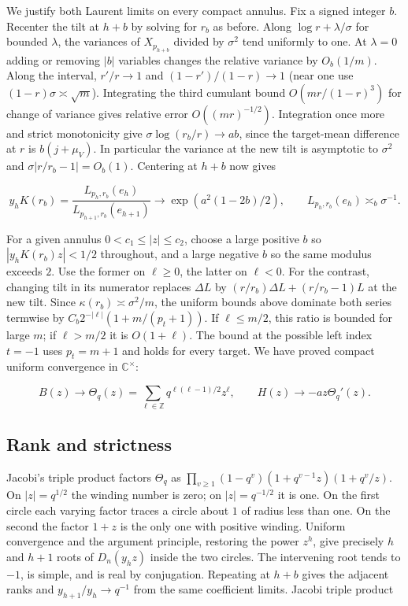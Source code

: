 \documentclass[11pt]{article}
\begin{document}
We justify both Laurent limits on every compact annulus. Fix a signed integer \(b\). Recenter the tilt at \(h+b\) by solving for \(r_b\) as before. Along \(\log r+\lambda/\sigma\) for bounded \(\lambda\), the variances of \(X_{p_{h+b}}\) divided by \(\sigma^2\) tend uniformly to one. At \(\lambda=0\) adding or removing \(|b|\) variables changes the relative variance by \(O_b(1/m)\). Along the interval, \(r'/r\to1\) and \((1-r')/(1-r)\to1\) (near one use \((1-r)\sigma\asymp\sqrt m\)). Integrating the third cumulant bound \(O(mr/(1-r)^3)\) for change of variance gives relative error \(O((mr)^{-1/2})\). Integration once more and strict monotonicity give \(\sigma\log(r_b/r)\to ab\), since the target-mean difference at \(r\) is \(b(j+\mu_V)\). In particular the variance at the new tilt is asymptotic to \(\sigma^2\) and \(\sigma|r/r_b-1|=O_b(1)\). Centering at \(h+b\) now gives

\begin{equation*}
y_h K(r_b)=\frac{L_{p_h,r_b}(e_h)}{L_{p_{h+1},r_b}(e_{h+1})}\longrightarrow \exp(a^2(1-2b)/2),\qquad
L_{p_h,r_b}(e_h)\asymp_b \sigma^{-1}.
\end{equation*}

For a given annulus \(0<c_1\le |z|\le c_2\), choose a large positive \(b\) so \(|y_hK(r_b)z|<1/2\) throughout, and a large negative \(b\) so the same modulus exceeds \(2\). Use the former on \(\ell\ge0\), the latter on \(\ell<0\). For the contrast, changing tilt in its numerator replaces \(\Delta L\) by \((r/r_b)\Delta L+(r/r_b-1)L\) at the new tilt. Since \(\kappa(r_b)\asymp\sigma^2/m\), the uniform bounds above dominate both series termwise by \(C_b2^{-|\ell|}(1+m/(p_t+1))\). If \(\ell\le m/2\), this ratio is bounded for large \(m\); if \(\ell>m/2\) it is \(O(1+\ell)\). The bound at the possible left index \(t=-1\) uses \(p_t=m+1\) and holds for every target. We have proved compact uniform convergence in \(\mathbb C^\times\):

\begin{equation*}
B(z)\longrightarrow \Theta_q(z)=\sum_{\ell\in\mathbb Z}q^{\ell(\ell-1)/2}z^\ell,\qquad
H(z)\longrightarrow -a z\Theta_q'(z).
\end{equation*}

\subsection{Rank and strictness}
\label{sec:rank-and-strictness}

Jacobi's triple product factors \(\Theta_q\) as \(\prod_{v\ge1}(1-q^v)(1+q^{v-1}z)(1+q^v/z)\). On \(|z|=q^{1/2}\) the winding number is zero; on \(|z|=q^{-1/2}\) it is one. On the first circle each varying factor traces a circle about \(1\) of radius less than one. On the second the factor \(1+z\) is the only one with positive winding. Uniform convergence and the argument principle, restoring the power \(z^h\), give precisely \(h\) and \(h+1\) roots of \(D_n(y_h z)\) inside the two circles. The intervening root tends to \(-1\), is simple, and is real by conjugation. Repeating at \(h+b\) gives the adjacent ranks and \(y_{h+1}/y_h\to q^{-1}\) from the same coefficient limits. Jacobi triple product~\cite{dlmf}
\end{document}
